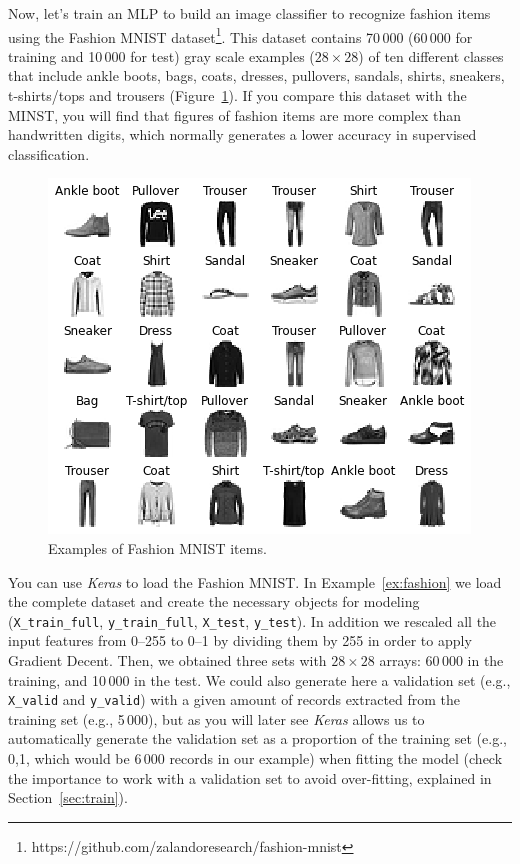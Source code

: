 Now, let's train an MLP to build an image classifier to recognize fashion items using the Fashion MNIST dataset\footnote{https://github.com/zalandoresearch/fashion-mnist}. This dataset contains 70\,000 (60\,000 for training and 10\,000 for test) gray scale examples ($28\times 28$) of ten different classes that include ankle boots, bags, coats, dresses, pullovers, sandals, shirts, sneakers, t-shirts/tops and trousers (Figure~\ref{fig:fashion}). If you compare this dataset with the MINST, you will find that figures of fashion items are more complex than handwritten digits, which normally generates a lower accuracy in supervised classification.

\begin{figure}
\centering
\includegraphics[width=0.9\linewidth]{figures/ch15_fashion.png}
\caption{Examples of Fashion MNIST items.}
\label{fig:fashion}
\end{figure}

You can use \emph{Keras} to load the Fashion MNIST. In Example~\ref{ex:fashion} we load the complete dataset and create the necessary objects for modeling (\texttt{X\_train\_full}, \texttt{y\_train\_full}, \texttt{X\_test}, \texttt{y\_test}). In addition we rescaled all the input features from 0--255 to 0--1 by dividing them by 255 in order to apply Gradient Decent. Then, we obtained three sets with $28\times 28$ arrays: 60\,000 in the training, and 10\,000 in the test. We could also generate here a validation set (e.g., \texttt{X\_valid} and \texttt{y\_valid}) with a given amount of records extracted from the training set (e.g., 5\,000), but as you will later see  \emph{Keras} allows us to automatically generate the validation set as a proportion of the training set (e.g., 0,1, which would be 6\,000 records in our example) when fitting the model (check the importance to work with a validation set to avoid over-fitting, explained in Section~\ref{sec:train}).


